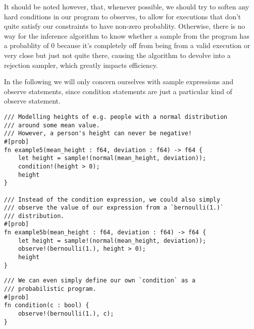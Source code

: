 It should be noted however, that, whenever possible, we should try to soften any hard conditions in our program to observes, to allow for executions that don't quite satisfy our constraints to have non-zero probablity. Otherwise, there is no way for the inference algorithm to know whether a sample from the program has a probablity of 0 because it's completely off from being from a valid execution or very close but just not quite there, causing the algorithm to devolve into a rejection sampler, which greatly impacts efficiency.

In the following we will only concern ourselves with sample expressions and observe statements, since condition statements are just a particular kind of observe statement.

\begin{minipage}{\linewidth}
\begin{lstlisting}
/// Modelling heights of e.g. people with a normal distribution
/// around some mean value.
/// However, a person's height can never be negative!
#[prob]
fn example5(mean_height : f64, deviation : f64) -> f64 {
    let height = sample!(normal(mean_height, deviation));
    condition!(height > 0);
    height
}

/// Instead of the condition expression, we could also simply
/// observe the value of our expression from a `bernoulli(1.)`
/// distribution.
#[prob]
fn example5b(mean_height : f64, deviation : f64) -> f64 {
    let height = sample!(normal(mean_height, deviation));
    observe!(bernoulli(1.), height > 0);
    height
}
\end{lstlisting}
\end{minipage}

\begin{minipage}{\linewidth}
\begin{lstlisting}
/// We can even simply define our own `condition` as a 
/// probabilistic program.
#[prob]
fn condition(c : bool) {
    observe!(bernoulli(1.), c);
}
\end{lstlisting}
\end{minipage}